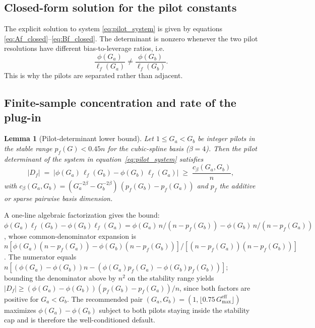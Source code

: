 \documentclass{article}
\newtheorem{lemma}{Lemma}
\begin{document}
\subsection{Closed-form solution for the pilot constants}

The explicit solution to system \eqref{eq:pilot_system} is given by equations \eqref{eq:Af_closed}--\eqref{eq:Bf_closed}. The determinant is nonzero whenever the two pilot resolutions have different bias-to-leverage ratios, i.e.
\[
\frac{\phi(G_a)}{\ell_f(G_a)}\ne \frac{\phi(G_b)}{\ell_f(G_b)}.
\]
This is why the pilots are separated rather than adjacent.

\subsection{Finite-sample concentration and rate of the plug-in}
\label{app:plugin_rate}

\begin{lemma}[Pilot-determinant lower bound]
\label{lem:pilot_determinant}
Let $1 \le G_a < G_b$ be integer pilots in the stable range $p_f(G) < 0.45 n$ for the cubic-spline basis ($\beta = 4$). Then the pilot determinant of the system in equation~\eqref{eq:pilot_system} satisfies
\[
   |D_f| \;=\; \bigl|\phi(G_a)\,\ell_f(G_b) - \phi(G_b)\,\ell_f(G_a)\bigr|
   \;\ge\; \frac{c_\beta(G_a, G_b)}{n} ,
\]
with $c_\beta(G_a, G_b) = (G_a^{-2\beta} - G_b^{-2\beta})\,(p_f(G_b) - p_f(G_a))$ and $p_f$ the additive or sparse pairwise basis dimension.
\end{lemma}

A one-line algebraic factorization gives the bound: $\phi(G_a)\ell_f(G_b) - \phi(G_b)\ell_f(G_a) = \phi(G_a)\,n/(n - p_f(G_b)) - \phi(G_b)\,n/(n - p_f(G_a))$, whose common-denominator expansion is $n[\phi(G_a)(n - p_f(G_a)) - \phi(G_b)(n - p_f(G_b))]/[(n - p_f(G_a))(n - p_f(G_b))]$. The numerator equals $n[(\phi(G_a) - \phi(G_b))n - (\phi(G_a) p_f(G_a) - \phi(G_b) p_f(G_b))]$; bounding the denominator above by $n^2$ on the stability range yields $|D_f| \ge (\phi(G_a) - \phi(G_b))(p_f(G_b) - p_f(G_a))/n$, since both factors are positive for $G_a < G_b$. The recommended pair $(G_a, G_b) = (1, \lfloor 0.75\, G_{\max}^{\mathrm{eff}}\rfloor)$ maximizes $\phi(G_a) - \phi(G_b)$ subject to both pilots staying inside the stability cap and is therefore the well-conditioned default.
\end{document}
